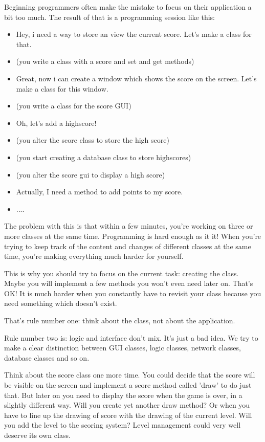 Beginning programmers often make the mistake to focus on their application a bit too much. The result of that is a programming session like this:

\begin{itemize}
  \item Hey, i need a way to store an view the current score. Let's make a class for that.
  \item (you write a class with a score and set and get methods)
  \item Great, now i can create a window which shows the score on the screen. Let's make a class for this window.
  \item (you write a class for the score GUI)
  \item Oh, let's add a highscore!
  \item (you alter the score class to store the high score)
  \item (you start creating a database class to store highscores)
  \item (you alter the score gui to display a high score)
  \item Actually, I need a method to add points to my score.
  \item ....
\end{itemize}

The problem with this is that within a few minutes, you're working on three or more classes at the same time. Programming is hard enough as it it! When you're trying to keep track of the content and changes of different classes at the same time, you're making everything much harder for yourself.

This is why you should try to focus on the current task: creating the class. Maybe you will implement a few methods you won't even need later on. That's OK! It is much harder when you constantly have to revisit your class because you need something which doesn't exist.

That's rule number one: think about the class, not about the application. 

Rule number two is: logic and interface don't mix. It's just a bad idea. We try to make a clear distinction between GUI classes, logic classes, network classes, database classes and so on.

Think about the score class one more time. You could decide that the score will be visible on the screen and implement a score method called 'draw' to do just that. But later on you need to display the score when the game is over, in a slightly different way. Will you create yet another draw method? Or when you have to line up the drawing of score with the drawing of the current level. Will you add the level to the scoring system? Level management could very well deserve its own class.

